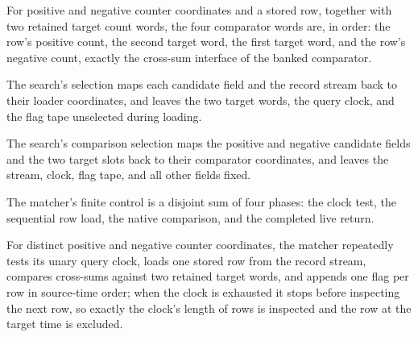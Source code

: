 \begin{definition}
\label{Complexity.clMatchWords}
\leanok
For positive and negative counter coordinates and a stored row, together with two retained target count words, the four comparator words are, in order: the row's positive count, the second target word, the first target word, and the row's negative count, exactly the cross-sum interface of the banked comparator.
\end{definition}

\begin{definition}
\label{Complexity.clMatchLoadSelect}
\leanok
{}
The search's selection maps each candidate field and the record stream back to their loader coordinates, and leaves the two target words, the query clock, and the flag tape unselected during loading.
\end{definition}

\begin{definition}
\label{Complexity.clMatchCmpSelect}
\leanok
{}
The search's comparison selection maps the positive and negative candidate fields and the two target slots back to their comparator coordinates, and leaves the stream, clock, flag tape, and all other fields fixed.
\end{definition}

\begin{definition}
\label{Complexity.clMatchState}
\leanok
{}
The matcher's finite control is a disjoint sum of four phases: the clock test, the sequential row load, the native comparison, and the completed live return.
\end{definition}

\begin{definition}
\label{Complexity.clMatchTM}
\leanok
{}
For distinct positive and negative counter coordinates, the matcher repeatedly tests its unary query clock, loads one stored row from the record stream, compares cross-sums against two retained target words, and appends one flag per row in source-time order; when the clock is exhausted it stops before inspecting the next row, so exactly the clock's length of rows is inspected and the row at the target time is excluded.
\end{definition}

